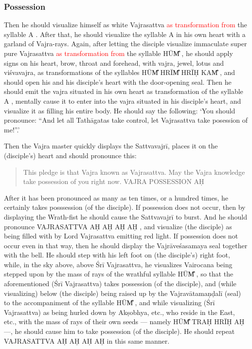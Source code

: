 \documentclass[11pt]{book}
\makeatletter
\def\fakesc#1{%
  \begingroup%
  \xdef\fake@name{\csname\curr@fontshape/\f@size\endcsname}%
  \fontsize{1.3\fontdimen8\fake@name}{\baselineskip}\selectfont%
  \uppercase{#1}%
  \endgroup%
}
\newcommand{\mantra}[1]{\fakesc{#1}}
\newcommand{\red}[1]{\textcolor{red}{#1}}
\makeatother
\begin{document}
\subsubsection{Possession}
Then he should visualize himself as white Vajrasattva \red{as transformation from} the syllable \mantra{a}. After that, he should visualize the syllable \mantra{a} in his own heart with a garland of Vajra-rays. Again, after letting the disciple visualize immaculate super pure Vajrasattva  \red{as transformation from} the syllable \mantra{hūm̐}, he should apply signs on his heart, brow, throat and forehead, with vajra, jewel, lotus and viśvavajra, as transformations of the syllables  \mantra{hūm̐ hrīm̐ hrīḥ kam̐}, and should  open his and his disciple's heart with the door-opening seal. Then he should emit the vajra situated in his own heart as transformation of the syllable \mantra{a}, mentally cause it to enter into the vajra situated in his disciple's heart, and visualize it as filling his entire body. He should say the following: `You should pronounce: ``And let all Tathāgatas take control, let Vajrasattva take posession of me!''.'

Then the Vajra master quickly displays the Sattvavajrī, places it on the (disciple's) heart and should pronounce this:

\begin{verse}
This pledge is that Vajra known as Vajrasattva. May the Vajra knowledge take possession of you right now.
\mantra{vajra possession aḥ}
\end{verse}

After it has been pronounced as many as ten times, or a hundred times, he certainly takes posssession (of the disciple). If possession does not occur, then by displaying the Wrath-fist he should cause the Sattvavajrī to burst. And he should pronounce \mantra{vajrasattva aḥ aḥ aḥ aḥ}, and visualize (the disciple) as being filled with by Lord Vajrasattva emitting red light. If possession does not occur even in that way, then he should display the Vajrāveśasamaya seal together with the bell. He should step with his left foot on (the disciple's) right foot, while, in the sky above, above Śrī Vajrasattva, he visualizes Vairocana being stepped upon by the mass of rays of the wrathful syllable \mantra{hūm̐}, 
	so that the aforementioned (Śrī Vajrasattva) takes possession (of the disciple),
and (while visualizing) below (the disciple) being raised up by the Vajravātamaṇḍalī (seal) to the accompaniment of the syllable \mantra{hūm̐}, and while visualizing (Śrī Vajrasattva) as being hurled down by Akṣobhya, etc., who reside in the East, etc., with the mass of rays of their own seeds — namely \mantra{hūm̐ traḥ hrīḥ aḥ} —, he should cause him to take possession (of the disciple). He should repeat \mantra{vajrasattva aḥ aḥ aḥ aḥ} in this same manner.
\end{document}
